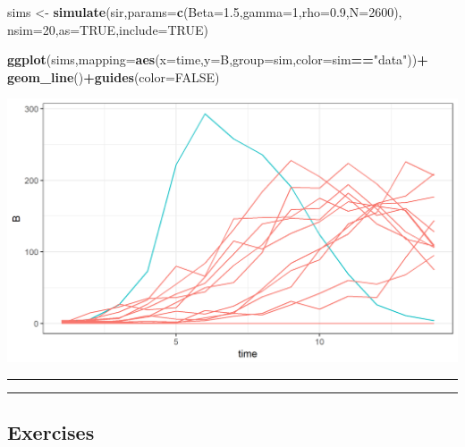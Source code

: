 \documentclass[]{article}
\newenvironment{Shaded}{\begin{snugshade}}{\end{snugshade}}
\newcommand{\KeywordTok}[1]{\textcolor[rgb]{0.13,0.29,0.53}{\textbf{#1}}}
\newcommand{\DataTypeTok}[1]{\textcolor[rgb]{0.13,0.29,0.53}{#1}}
\newcommand{\DecValTok}[1]{\textcolor[rgb]{0.00,0.00,0.81}{#1}}
\newcommand{\FloatTok}[1]{\textcolor[rgb]{0.00,0.00,0.81}{#1}}
\newcommand{\StringTok}[1]{\textcolor[rgb]{0.31,0.60,0.02}{#1}}
\newcommand{\OtherTok}[1]{\textcolor[rgb]{0.56,0.35,0.01}{#1}}
\newcommand{\OperatorTok}[1]{\textcolor[rgb]{0.81,0.36,0.00}{\textbf{#1}}}
\newcommand{\NormalTok}[1]{#1}
\begin{document}
\begin{Shaded}
\begin{Highlighting}[]
\NormalTok{sims <-}\StringTok{ }\KeywordTok{simulate}\NormalTok{(sir,}\DataTypeTok{params=}\KeywordTok{c}\NormalTok{(}\DataTypeTok{Beta=}\FloatTok{1.5}\NormalTok{,}\DataTypeTok{gamma=}\DecValTok{1}\NormalTok{,}\DataTypeTok{rho=}\FloatTok{0.9}\NormalTok{,}\DataTypeTok{N=}\DecValTok{2600}\NormalTok{),}
                 \DataTypeTok{nsim=}\DecValTok{20}\NormalTok{,}\DataTypeTok{as=}\OtherTok{TRUE}\NormalTok{,}\DataTypeTok{include=}\OtherTok{TRUE}\NormalTok{)}

\KeywordTok{ggplot}\NormalTok{(sims,}\DataTypeTok{mapping=}\KeywordTok{aes}\NormalTok{(}\DataTypeTok{x=}\NormalTok{time,}\DataTypeTok{y=}\NormalTok{B,}\DataTypeTok{group=}\NormalTok{sim,}\DataTypeTok{color=}\NormalTok{sim}\OperatorTok{==}\StringTok{"data"}\NormalTok{))}\OperatorTok{+}
\StringTok{  }\KeywordTok{geom_line}\NormalTok{()}\OperatorTok{+}\KeywordTok{guides}\NormalTok{(}\DataTypeTok{color=}\OtherTok{FALSE}\NormalTok{)}
\end{Highlighting}
\end{Shaded}

\begin{center}\includegraphics{figure/notes11-unnamed-chunk-1-1} \end{center}

\begin{center}\rule{0.5\linewidth}{\linethickness}\end{center}

\begin{center}\rule{0.5\linewidth}{\linethickness}\end{center}

\subsection{Exercises}\label{exercises-2}
\end{document}
